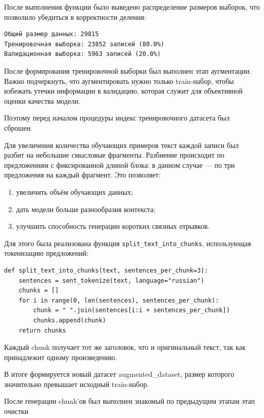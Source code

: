 \documentclass[coursework]{SCWorks}
\begin{document}
    После выполнения функции было выведено распределение размеров выборок, что позволило убедиться в корректности деления:
    \begin{verbatim}
Общий размер данных: 29815
Тренировочная выборка: 23852 записей (80.0%)
Валидационная выборка: 5963 записей (20.0%)
    \end{verbatim}






    После формирования тренировочной выборки был выполнен этап аугментации.
    Важно подчеркнуть, что аугментировать нужно только train-набор, чтобы избежать утечки информации в валидацию,
    которая служит для объективной оценки качества модели.

    Поэтому перед началом процедуры индекс тренировочного датасета был сброшен.


    Для увеличения количества обучающих примеров текст каждой записи был разбит на небольшие смысловые фрагменты. Разбиение происходит по предложениям с фиксированной длиной блока: в данном случае — по три предложения на каждый фрагмент. Это позволяет:
    \begin{enumerate}
        \item увеличить объём обучающих данных;
        \item дать модели больше разнообразия контекста;
        \item улучшить способность генерации коротких связных отрывков.
    \end{enumerate}

    Для этого была реализована функция \texttt{split\_text\_into\_chunks}, использующая токенизацию предложений:

    \begin{verbatim}
def split_text_into_chunks(text, sentences_per_chunk=3):
    sentences = sent_tokenize(text, language="russian")
    chunks = []
    for i in range(0, len(sentences), sentences_per_chunk):
        chunk = " ".join(sentences[i:i + sentences_per_chunk])
        chunks.append(chunk)
    return chunks
    \end{verbatim}


    Каждый chunk получает тот же заголовок, что и оригинальный текст, так как принадлежит одному произведению.

    В итоге формируется новый датасет augmented\_dataset, размер которого значительно превышает исходный train-набор.


    После генерации chunk’ов был выполнен знакомый по предыдущим этапам {этап очистки}
\end{document}
